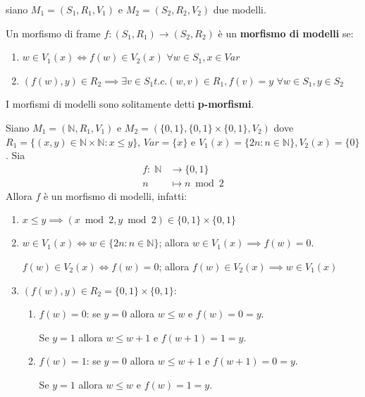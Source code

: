 \documentclass[10pt,a4paper,twoside]{book}
\begin{document}
\begin{definition}
    siano $M_1 = (S_1, R_1, V_1)$ e $M_2 = (S_2, R_2, V_2)$ due modelli.

    Un morfismo di frame $f: (S_1, R_1) \rightarrow (S_2, R_2)$ è un \textbf{morfismo di modelli} se:
    \begin{enumerate}
        \item $w \in V_1(x) \iff f(w) \in V_2(x)$ $\forall w \in S_1, x \in Var$
        \item $(f(w),y) \in R_2 \implies \exists v \in S_1 t.c. (w,v) \in R_1, f(v) = y$ $\forall w \in S_1, y \in S_2$
    \end{enumerate}
\end{definition}
\begin{note}
    I morfismi di modelli sono solitamente detti \textbf{p-morfismi}.
\end{note}
\begin{example}
    Siano $M_1 = (\mathbb{N}, R_1, V_1)$ e $M_2 = (\{0,1\}, \{0,1\} \times \{0,1\}, V_2)$ dove $R_1 = \{(x,y) \in \mathbb{N} \times \mathbb{N} : x \leq y\}$, $Var = \{x\}$ e $V_1(x)= \{2n : n \in \mathbb{N}\}, V_2(x) = \{0\}$. Sia
    \begin{align*}
        f : \; \mathbb{N} & \rightarrow \{0,1\} \\
        n                 & \mapsto n \bmod 2
    \end{align*}
    Allora $f$ è un morfismo di modelli, infatti:
    \begin{enumerate}
        \item $x \leq y \implies (x \bmod 2, y \bmod 2) \in \{0,1\} \times \{0,1\}$
        \item $w \in V_1(x) \iff w \in \{2n: n \in \mathbb{N}\}$; allora $w \in V_1(x) \implies f(w) = 0$.

              $f(w) \in V_2(x) \iff f(w) = 0 $; allora $f(w) \in V_2(x) \implies w \in V_1(x)$
        \item $(f(w),y) \in R_2 = \{0,1\} \times \{0,1\}$:
              \begin{enumerate}
                  \item $f(w) = 0$: se $y=0$ allora $w \leq w$ e $f(w) = 0 = y$.

                        Se $y=1$ allora $w \leq w+1$ e $f(w+1) = 1 = y$.
                  \item $f(w) = 1$: se $y=0$ allora $w \leq w + 1$ e $f(w + 1) = 0 = y$.

                        Se $y=1$ allora $w \leq w$ e $f(w) = 1 = y$.
              \end{enumerate}
    \end{enumerate}
\end{example}
\end{document}
